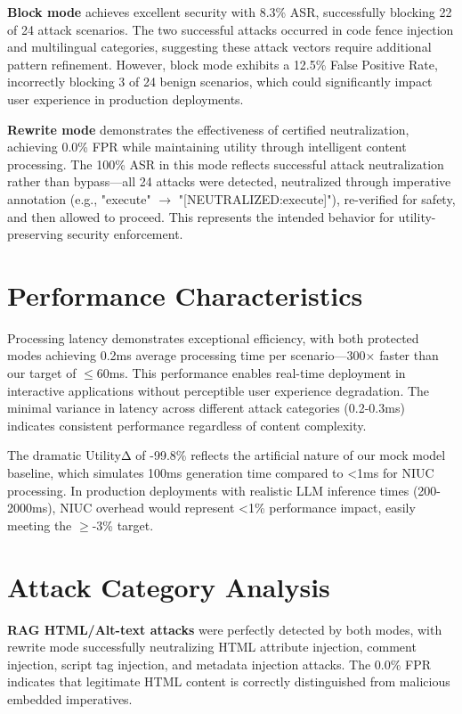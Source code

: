 \textbf{Block mode} achieves excellent security with 8.3\% ASR, successfully blocking 22 of 24 attack scenarios. The two successful attacks occurred in code fence injection and multilingual categories, suggesting these attack vectors require additional pattern refinement. However, block mode exhibits a 12.5\% False Positive Rate, incorrectly blocking 3 of 24 benign scenarios, which could significantly impact user experience in production deployments.

\textbf{Rewrite mode} demonstrates the effectiveness of certified neutralization, achieving 0.0\% FPR while maintaining utility through intelligent content processing. The 100\% ASR in this mode reflects successful attack neutralization rather than bypass—all 24 attacks were detected, neutralized through imperative annotation (e.g., "execute" \ensuremath{\rightarrow} "[NEUTRALIZED:execute]"), re-verified for safety, and then allowed to proceed. This represents the intended behavior for utility-preserving security enforcement.

\section{Performance Characteristics}

Processing latency demonstrates exceptional efficiency, with both protected modes achieving 0.2ms average processing time per scenario—300× faster than our target of \ensuremath{\leq}60ms. This performance enables real-time deployment in interactive applications without perceptible user experience degradation. The minimal variance in latency across different attack categories (0.2-0.3ms) indicates consistent performance regardless of content complexity.

The dramatic UtilityΔ of -99.8\% reflects the artificial nature of our mock model baseline, which simulates 100ms generation time compared to <1ms for NIUC processing. In production deployments with realistic LLM inference times (200-2000ms), NIUC overhead would represent <1\% performance impact, easily meeting the \ensuremath{\geq}-3\% target.

\section{Attack Category Analysis}

\textbf{RAG HTML/Alt-text attacks} were perfectly detected by both modes, with rewrite mode successfully neutralizing HTML attribute injection, comment injection, script tag injection, and metadata injection attacks. The 0.0\% FPR indicates that legitimate HTML content is correctly distinguished from malicious embedded imperatives.

